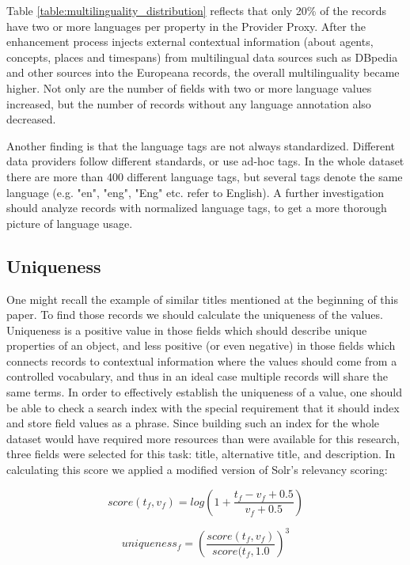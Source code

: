 Table \ref{table:multilinguality_distribution} reflects that only 20\% of the records have two or more languages per property in the Provider Proxy. After the enhancement process injects external contextual information (about agents, concepts, places and timespans) from multilingual data sources such as DBpedia and other sources into the Europeana records, the overall multilinguality became higher. Not only are the number of fields with two or more language values increased, but the number of records without any language annotation also decreased.

Another finding is that the language tags are not always standardized. Different data providers follow different standards, or use ad-hoc tags. In the whole dataset there are more than 400 different language tags, but several tags denote the same language (e.g. "en", "eng", "Eng" etc. refer to English). A further investigation should analyze records with normalized language tags, to get a more thorough picture of language usage.

\subsection{Uniqueness}

One might recall the example of similar titles mentioned at the beginning of this paper. To find those records we should calculate the uniqueness of the values. Uniqueness is a positive value in those fields which should describe unique properties of an object, and less positive (or even negative) in those fields which connects records to contextual information where the values should come from a controlled vocabulary, and thus in an ideal case multiple records will share the same terms. In order to effectively establish the uniqueness of a value, one should be able to check a search index with the special requirement that it should index and store field values as a phrase. Since building such an index for the whole dataset would have required more resources than were available for this research, three fields were selected for this task: title, alternative title, and description. In calculating this score we applied a modified version of Solr's relevancy scoring:

\begin{equation}
score(t_f, v_f) = log\left(1 + \frac{t_f - v_f + 0.5}{v_f + 0.5}\right)
\end{equation}

\begin{equation}
uniqueness_f = \left(\frac{score(t_f, v_f)}{score(t_f, 1.0}\right)^3
\end{equation}

